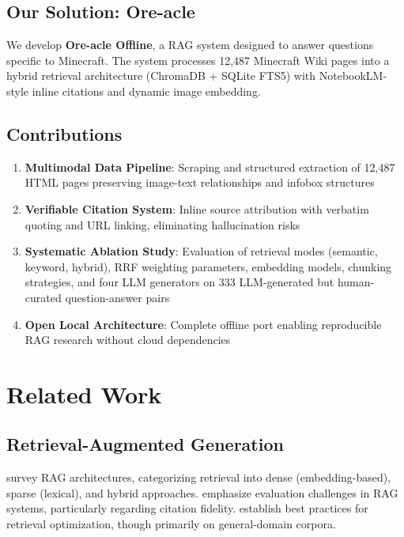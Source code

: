 \documentclass[11pt,a4paper]{article}
\begin{document}
\subsection{Our Solution: Ore-acle}
We develop \textbf{Ore-acle Offline}, a RAG system designed to answer questions specific to Minecraft. The system processes 12,487 Minecraft Wiki pages into a hybrid retrieval architecture (ChromaDB + SQLite FTS5) with NotebookLM-style inline citations and dynamic image embedding.

\subsection{Contributions}
\begin{enumerate}
    \item \textbf{Multimodal Data Pipeline}: Scraping and structured extraction of 12,487 HTML pages preserving image-text relationships and infobox structures
    \item \textbf{Verifiable Citation System}: Inline source attribution with verbatim quoting and URL linking, eliminating hallucination risks
    \item \textbf{Systematic Ablation Study}: Evaluation of retrieval modes (semantic, keyword, hybrid), RRF weighting parameters, embedding models, chunking strategies, and four LLM generators on 333 LLM-generated but human-curated question-answer pairs
    \item \textbf{Open Local Architecture}: Complete offline port enabling reproducible RAG research without cloud dependencies
\end{enumerate}

\section{Related Work}

\subsection{Retrieval-Augmented Generation}
\citet{gao2023retrieval} survey RAG architectures, categorizing retrieval into dense (embedding-based), sparse (lexical), and hybrid approaches. \citet{yu2024evaluation} emphasize evaluation challenges in RAG systems, particularly regarding citation fidelity. \citet{li2025enhancing} establish best practices for retrieval optimization, though primarily on general-domain corpora.
\end{document}
